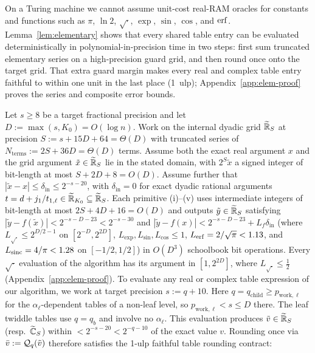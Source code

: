 On a Turing machine we cannot assume unit-cost real-RAM oracles for constants and functions such as $\pi$, $\ln 2$, $\sqrt{\cdot}$, $\exp$, $\sin$, $\cos$, and $\operatorname{erf}$. Lemma~\ref{lem:elementary} shows that every shared table entry can be evaluated deterministically in polynomial-in-precision time in two steps: first sum truncated elementary series on a high-precision guard grid, and then round once onto the target grid. That extra guard margin makes every real and complex table entry faithful to within one unit in the last place (1~ulp); Appendix~\ref{app:elem-proof} proves the series and composite error bounds.

\begin{lemma}\label{lem:elementary}
Let $s \ge 8$ be a target fractional precision and let $D := \max(s, K_0) = O(\log n)$. Work on the internal dyadic grid $\widetilde{\mathbb{R}}_S$ at precision $S := s + 15 D + 64 = \Theta(D)$ with truncated series of $N_{\mathrm{terms}} := 2 S + 36 D = \Theta(D)$ terms. Assume both the exact real argument $x$ and the grid argument $\tilde{x} \in \widetilde{\mathbb{R}}_S$ lie in the stated domain, with $2^S \tilde{x}$ a signed integer of bit-length at most $S + 2D + 8 = O(D)$. Assume further that $|\tilde{x} - x| \le \delta_{\mathrm{in}} \le 2^{-s-20}$, with $\delta_{\mathrm{in}} = 0$ for exact dyadic rational arguments $t = d + j_1/t_{1,\ell} \in \widetilde{\mathbb{R}}_{K_0} \subseteq \widetilde{\mathbb{R}}_S$.
Each primitive (i)--(v) uses intermediate integers of bit-length at most $2S + 4D + 16 = O(D)$ and outputs $\tilde{y} \in \widetilde{\mathbb{R}}_S$ satisfying $|\tilde{y} - f(\tilde{x})| < 2^{-s-D-23} < 2^{-s-30}$ and $|\tilde{y} - f(x)| < 2^{-s-D-23} + L_f \delta_{\mathrm{in}}$ (where $L_{\sqrt{\cdot}} \le 2^{D/2-1}$ on $[2^{-D}, 2^{2D}]$, $L_{\exp}, L_{\sin}, L_{\cos} \le 1$, $L_{\operatorname{erf}} = 2/\sqrt{\pi} < 1.13$, and $L_{\operatorname{sinc}} = 4/\pi < 1.28$ on $[-1/2, 1/2]$) in $O(D^3)$ schoolbook bit operations. Every $\sqrt{\cdot}$ evaluation of the algorithm has its argument in $[1, 2^{2D}]$, where $L_{\sqrt{\cdot}} \le \frac{1}{2}$ (Appendix~\ref{app:elem-proof}). To evaluate any real or complex table expression of our algorithm, we work at target precision $s := q + 10$. Here $q = q_{\mathrm{child}} \ge p_{\mathrm{work},\ell}$ for the $\alpha_\ell$-dependent tables of a non-leaf level, so $p_{\mathrm{work},\ell} < s \le D$ there. The leaf twiddle tables use $q = q_b$ and involve no $\alpha_\ell$. This evaluation produces $\tilde{v} \in \widetilde{\mathbb{R}}_S$ (resp.\ $\widetilde{\mathbb{C}}_S$) within $< 2^{-s-20} < 2^{-q-10}$ of the exact value $v$. Rounding once via $\bar{v} := \mathcal{Q}_q(\tilde{v})$ therefore satisfies the 1-ulp faithful table rounding contract:

\end{lemma}

